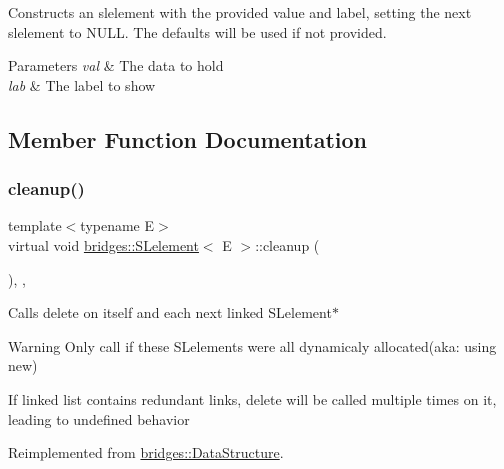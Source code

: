 Constructs an slelement with the provided value and label, setting the next slelement to N\+U\+LL. The defaults will be used if not provided.


\begin{DoxyParams}{Parameters}
{\em val} & The data to hold \\
\hline
{\em lab} & The label to show \\
\hline
\end{DoxyParams}


\subsection{Member Function Documentation}
\hypertarget{classbridges_1_1_s_lelement_ac747648849874407e9d907bb4557dd52}{}\label{classbridges_1_1_s_lelement_ac747648849874407e9d907bb4557dd52} 
\subsubsection{\texorpdfstring{cleanup()}{cleanup()}}
{\footnotesize\ttfamily template$<$typename E$>$ \\
virtual void \hyperlink{classbridges_1_1_s_lelement}{bridges\+::\+S\+Lelement}$<$ E $>$\+::cleanup (\begin{DoxyParamCaption}{ }\end{DoxyParamCaption})\hspace{0.3cm}{\ttfamily [inline]}, {\ttfamily [override]}, {\ttfamily [virtual]}}

Calls delete on itself and each next linked S\+Lelement$\ast$

\begin{DoxyWarning}{Warning}
Only call if these S\+Lelements were all dynamicaly allocated(aka\+: using new) 

If linked list contains redundant links, delete will be called multiple times on it, leading to undefined behavior 
\end{DoxyWarning}


Reimplemented from \hyperlink{classbridges_1_1_data_structure_ac3ad75810fd77f0ad35b9b5123d2c8f8}{bridges\+::\+Data\+Structure}.

\hypertarget{classbridges_1_1_s_lelement_a136330b3481a47b3edb429f323274655}{}\label{classbridges_1_1_s_lelement_a136330b3481a47b3edb429f323274655} 

